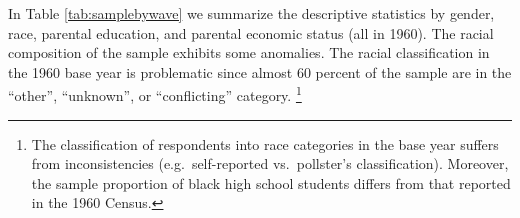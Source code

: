 \documentclass[onehalfspacing,11pt]{article}
\begin{document}
	In Table \ref{tab:samplebywave} we summarize the descriptive statistics by gender, race, parental education, and parental economic status (all in 1960). The racial composition of the sample exhibits some anomalies. The racial classification in the 1960 base year is problematic since almost 60 percent of the sample are in the ``other'', ``unknown'', or ``conflicting'' category.
	\footnote{The classification of respondents into race categories in the base year suffers from inconsistencies (e.g.~self-reported vs.~pollster's classification). Moreover, the sample proportion of black high school students differs from that reported in the 1960 Census.}
	
\end{document}
